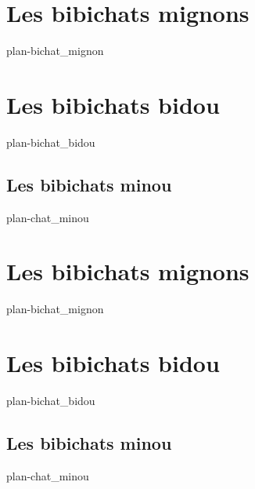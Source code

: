 \part{Les bibichats mignons}\label{part:bichat_mignon}
	{plan-bichat_mignon}

\part{Les bibichats bidou}\label{part:bichat_bidou}
	{plan-bichat_bidou}

\chapter{Les bibichats minou}\label{part:chat_minou}
	{plan-chat_minou}

\part{Les bibichats mignons}\label{part:bichat_mignon}
	{plan-bichat_mignon}

\part{Les bibichats bidou}\label{part:bichat_bidou}
	{plan-bichat_bidou}

\chapter{Les bibichats minou}\label{part:chat_minou}
	{plan-chat_minou}

